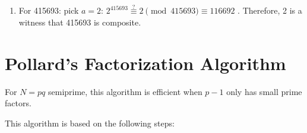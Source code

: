 {\begin{enumerate}
              \begin{itemize}
                  \item \(a = 3^{13291} \pmod{13291} \stackrel{?}{\equiv} 3\)\ \cmark%
                  \item \(a = 4^{13291} \pmod{13291} \stackrel{?}{\equiv} 4\)\ \cmark%
                  \item \(a = 5^{13291} \pmod{13291} \stackrel{?}{\equiv} 5\)\ \cmark%
                  \item \(a = 6^{13291} \pmod{13291} \stackrel{?}{\equiv} 6\)\ \cmark%
              \end{itemize}
              We can use the Miller-Rabin test to see if 13291 is prime. From the formula \(N - 1 = 2^kq\) with \(q\) odd: \(13290 = 2^1 \cdot 6645\). Pick random \(a\)'s and solve for \(a^{6645} \pmod{13291} \stackrel{?}{\equiv} 1\):
              \begin{itemize}
                  \item \(a = 3^{6645} \pmod{13291} \equiv 13290\)\ \cmark%
                  \item \(a = 7^{6645} \pmod{13291} \equiv 1\)\ \cmark%
                  \item \(a = 11^{6645} \pmod{13291} \equiv 13290\)\ \cmark%
                  \item \(a = 13^{6645} \pmod{13291} \equiv 13290\)\ \cmark%
                  \item \(a = 17^{6645} \pmod{13291} \equiv 13290\)\ \cmark%
              \end{itemize} Either 13290 is prime, or all \(a\)'s that we have chosen are Miller-Rabin liars.
        \item For 415693: pick \(a = 2\): \(2^{415693} \stackrel{?}{\equiv} 2 \pmod{415693} \equiv 116692\) \xmark. Therefore, 2 is a witness that 415693 is composite.
    \end{enumerate}
}

\renewcommand{\theenumi}{\arabic{enumi}}
\renewcommand{\labelenumi}{\theenumi.}
\section{Pollard's Factorization Algorithm}

For \(N = pq\) semiprime, this algorithm is efficient when \(p -1\) only has small prime factors.

This algorithm is based on the following steps:

